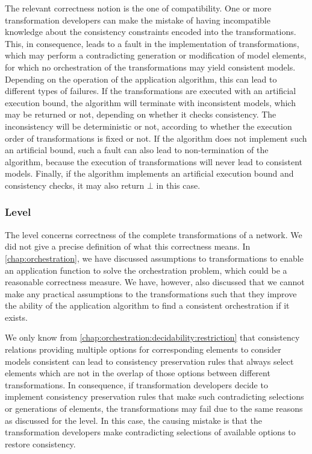 The relevant correctness notion is the one of compatibility.
One or more transformation developers can make the mistake of having incompatible knowledge about the consistency constraints encoded into the transformations.
This, in consequence, leads to a fault in the implementation of transformations, which may perform a contradicting generation or modification of model elements, for which no orchestration of the transformations may yield consistent models.
Depending on the operation of the application algorithm, this can lead to different types of failures.
If the transformations are executed with an artificial execution bound, the algorithm will terminate with inconsistent models, which may be returned or not, depending on whether it checks consistency.
The inconsistency will be deterministic or not, according to whether the execution order of transformations is fixed or not.
If the algorithm does not implement such an artificial bound, such a fault can also lead to non-termination of the algorithm, because the execution of transformations will never lead to consistent models.
Finally, if the algorithm implements an artificial execution bound and consistency checks, it may also return $\bot$ in this case.

\subsubsection*{\LevelNetworkRule Level}

The \levelnetworkrule level concerns correctness of the complete transformations of a network.
We did not give a precise definition of what this correctness means.
In \autoref{chap:orchestration}, we have discussed assumptions to transformations to enable an application function to solve the orchestration problem, which could be a reasonable correctness measure.
We have, however, also discussed that we cannot make any practical assumptions to the transformations such that they improve the ability of the application algorithm to find a consistent orchestration if it exists.

We only know from \autoref{chap:orchestration:decidability:restriction} that consistency relations providing multiple options for corresponding elements to consider models consistent can lead to consistency preservation rules that always select elements which are not in the overlap of those options between different transformations.
In consequence, if transformation developers decide to implement consistency preservation rules that make such contradicting selections or generations of elements, the transformations may fail due to the same reasons as discussed for the \levelnetworkrelation level.
In this case, the causing mistake is that the transformation developers make contradicting selections of available options to restore consistency.

